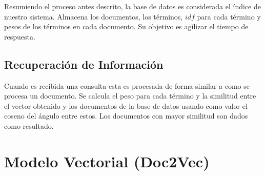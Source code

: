 \documentclass[12pt]{llncs}
\begin{document}
Resumiendo el proceso antes descrito, la base de datos es considerada el índice de nuestro sistema. Almacena los documentos, los términos, $idf$ para cada término y pesos de los términos en cada documento. Su objetivo es agilizar el tiempo de respuesta.

\subsection{Recuperación de Información}

Cuando es recibida una consulta esta es procesada de forma similar a como se procesa un documento. Se calcula el peso para cada término y la similitud entre el vector obtenido y los documentos de la base de datos usando como valor el coseno del ángulo entre estos. Los documentos con mayor similitud son dados como resultado.


\section{Modelo Vectorial (Doc2Vec)}
\end{document}
